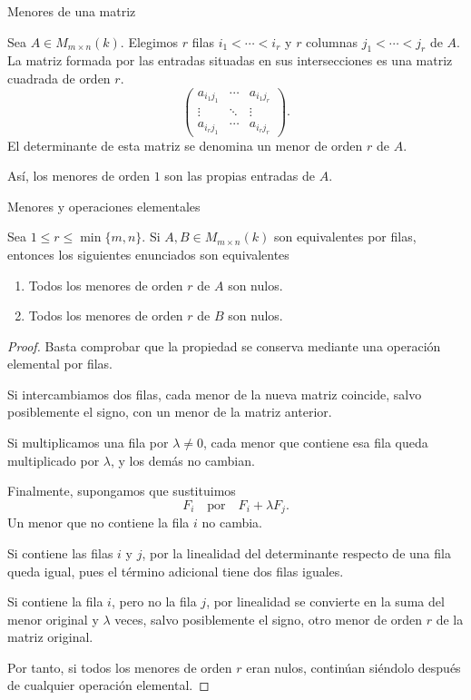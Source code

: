 \begin{frame}{Menores de una matriz}

\begin{definition}
Sea \(A\in M_{m\times n}(k)\). Elegimos \(r\) filas $i_1<\cdots<i_r$ y \(r\) columnas $j_1<\cdots<j_r$
de \(A\). La matriz formada por las entradas situadas en sus
intersecciones es una matriz cuadrada de orden \(r\).
\[
\left(
\begin{array}{ccc}
a_{i_1j_1} & \cdots & a_{i_1j_r}\\
\vdots & \ddots & \vdots\\
a_{i_rj_1} & \cdots & a_{i_rj_r}
\end{array}
\right).
\]
El determinante de esta matriz se denomina un
\alert{menor de orden \(r\)} de \(A\).
\end{definition}

\medskip

Así, los menores de orden \(1\) son las propias entradas de \(A\).

\end{frame}

\begin{frame}[allowframebreaks]{Menores y operaciones elementales}

\begin{proposition}
Sea \(1\leq r\leq\min\{m,n\}\). Si \(A,B\in M_{m\times n}(k)\)
son equivalentes por filas, entonces los siguientes enunciados son equivalentes
\begin{enumerate}
	\item Todos los menores de orden \(r\) de \(A\) son nulos.
	\item Todos los menores de orden \(r\) de \(B\) son nulos.
\end{enumerate}
\end{proposition}

\begin{proof}
Basta comprobar que la propiedad se conserva mediante una operación
elemental por filas.

Si intercambiamos dos filas, cada menor de la nueva matriz coincide,
salvo posiblemente el signo, con un menor de la matriz anterior.

Si multiplicamos una fila por \(\lambda\neq0\), cada menor que
contiene esa fila queda multiplicado por \(\lambda\), y los demás
no cambian.

Finalmente, supongamos que sustituimos
\[
F_i\quad\text{por}\quad F_i+\lambda F_j.
\]
Un menor que no contiene la fila \(i\) no cambia.

Si contiene las filas \(i\) y \(j\), por la linealidad del
determinante respecto de una fila queda igual, pues el término
adicional tiene dos filas iguales.

Si contiene la fila \(i\), pero no la fila \(j\), por linealidad se
convierte en la suma del menor original y \(\lambda\) veces, salvo
posiblemente el signo, otro menor de orden \(r\) de la matriz
original.

Por tanto, si todos los menores de orden \(r\) eran nulos, continúan
siéndolo después de cualquier operación elemental.
\end{proof}

\end{frame}

